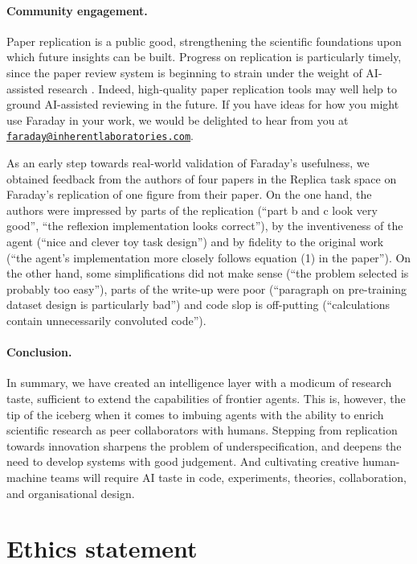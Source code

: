 \documentclass[garamond,a4paper]{inherent}
\begin{document}
\paragraph{Community engagement.}
Paper replication is a public good, strengthening the scientific foundations upon which future insights can be built.
Progress on replication is particularly timely, since the paper review system is beginning to strain under the weight of AI-assisted research \citep{gartenberg2026more}.
Indeed, high-quality paper replication tools may well help to ground AI-assisted reviewing in the future.
If you have ideas for how you might use Faraday in your work, we would be delighted to hear from you at \href{mailto:faraday@inherentlaboratories.com}{\texttt{faraday@inherentlaboratories.com}}.

As an early step towards real-world validation of Faraday's usefulness, we obtained feedback from the authors of four papers in the Replica task space \citep{rupp2012fast, chemvae, reed2022generalist, sakanaaiscientist} on Faraday's replication of one figure from their paper.
On the one hand, the authors were impressed by parts of the replication (``part b and c look very good'', ``the reflexion implementation looks correct''), by the inventiveness of the agent (``nice and clever toy task design'') and by fidelity to the original work (``the agent's implementation more closely follows equation (1) in the paper''). 
On the other hand, some simplifications did not make sense (``the problem selected is probably too easy''), parts of the write-up were poor (``paragraph on pre-training dataset design is particularly bad'') and code slop is off-putting (``calculations contain unnecessarily convoluted code'').

\paragraph{Conclusion.} In summary, we have created an intelligence layer with a modicum of research taste, sufficient to extend the capabilities of frontier agents.
This is, however, the tip of the iceberg when it comes to imbuing agents with the ability to enrich scientific research as peer collaborators with humans.
Stepping from replication towards innovation sharpens the problem of underspecification, and deepens the need to develop systems with good judgement.
And cultivating creative human-machine teams will require AI taste in code, experiments, theories, collaboration, and organisational design. 

\section*{Ethics statement}
\end{document}
